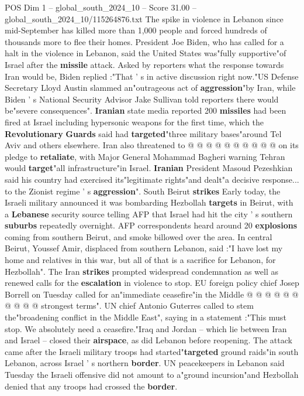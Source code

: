 \begin{textsample}{POS Dim 1 – global\_south\_2024\_10 – Score 31.00 – global\_south\_2024\_10/115264876.txt}
The spike in violence in Lebanon since mid-September has killed more than 1,000 people and forced hundreds of thousands more to flee their homes.
President Joe Biden, who has called for a halt in the violence in Lebanon, said the United States was"fully supportive"of Israel after the \textbf{missile} attack.
Asked by reporters what the response towards Iran would be, Biden replied :"That ' s in active discussion right now."US Defense Secretary Lloyd Austin slammed an"outrageous act of \textbf{aggression}"by Iran, while Biden ' s National Security Advisor Jake Sullivan told reporters there would be"severe consequences". \textbf{Iranian} state media reported 200 \textbf{missiles} had been fired at Israel including hypersonic weapons for the first time, which the \textbf{Revolutionary} \textbf{Guards} said had \textbf{targeted}"three military bases"around Tel Aviv and others elsewhere.
Iran also threatened to @ @ @ @ @ @ @ @ @ @ on its pledge to \textbf{retaliate}, with Major General Mohammad Bagheri warning Tehran would \textbf{target}"all infrastructure"in Israel. \textbf{Iranian} President Masoud Pezeshkian said his country had exercised its"legitimate rights"and dealt"a decisive response... to the Zionist regime ' s \textbf{aggression}".
South Beirut \textbf{strikes} Early today, the Israeli military announced it was bombarding Hezbollah \textbf{targets} in Beirut, with a \textbf{Lebanese} security source telling AFP that Israel had hit the city ' s southern \textbf{suburbs} repeatedly overnight.
AFP correspondents heard around 20 \textbf{explosions} coming from southern Beirut, and smoke billowed over the area.
In central Beirut, Youssef Amir, displaced from southern Lebanon, said :"I have lost my home and relatives in this war, but all of that is a sacrifice for Lebanon, for Hezbollah".
The Iran \textbf{strikes} prompted widespread condemnation as well as renewed calls for the \textbf{escalation} in violence to stop.
EU foreign policy chief Josep Borrell on Tuesday called for an"immediate ceasefire"in the Middle @ @ @ @ @ @ @ @ @ @ strongest terms".
UN chief Antonio Guterres called to stem the"broadening conflict in the Middle East", saying in a statement :"This must stop.
We absolutely need a ceasefire."Iraq and Jordan -- which lie between Iran and Israel -- closed their \textbf{airspace}, as did Lebanon before reopening.
The attack came after the Israeli military troops had started"\textbf{targeted} ground raids"in south Lebanon, across Israel ' s northern \textbf{border}.
UN peacekeepers in Lebanon said Tuesday the Israeli offensive did not amount to a"ground incursion"and Hezbollah denied that any troops had crossed the \textbf{border}.

\end{textsample}
